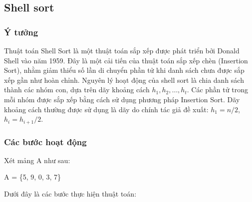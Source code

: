 \subsection{Shell sort}

\subsubsection{Ý tưởng}
Thuật toán Shell Sort là một thuật toán sắp xếp được phát triển bởi Donald Shell vào năm 1959. Đây là một cải tiến của thuật toán sắp xếp chèn (Insertion Sort), nhằm giảm thiểu số lần di chuyển phần tử khi danh sách chưa được sắp xếp gần như hoàn chỉnh.
Nguyên lý hoạt động của shell sort là chia danh sách thành các nhóm con, dựa trên dãy khoảng cách $h_1, h_2, \dots, h_t$. Các phần tử trong mỗi nhóm được sắp xếp bằng cách sử dụng phương pháp Insertion Sort. Dãy khoảng cách thường được sử dụng là dãy do chính tác giả đề xuất: $h_1 = n / 2$, $h_i = h_{i + 1} / 2$.

\subsubsection{Các bước hoạt động}
Xét mảng A như sau: 
\begin{center}
   A = \{5, 9, 0, 3, 7\} 
\end{center} 
Dưới đây là các bước thực hiện thuật toán:

